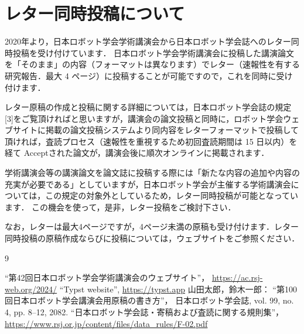 \section{レター同時投稿について}
2020年より，日本ロボット学会学術講演会から日本ロボット学会誌へのレター同時投稿を受け付けています．
日本ロボット学会学術講演会に投稿した講演論文を「そのまま」の内容（フォーマットは異なります）でレター（速報性を有する研究報告．最大 4 ページ）に投稿することが可能ですので，これを同時に受け付けます． 

レター原稿の作成と投稿に関する詳細については，日本ロボット学会誌の規定[3]をご覧頂ければと思いますが，講演会の論文投稿と同時に，ロボット学会ウェブサイトに掲載の論文投稿システムより同内容をレターフォーマットで投稿して頂ければ，査読プロセス（速報性を重視するため初回査読期間は 15 日以内）を経て Acceptされた論文が，講演会後に順次オンラインに掲載されます．

学術講演会等の講演論文を論文誌に投稿する際には「新たな内容の追加や内容の充実が必要である」としていますが，日本ロボット学会が主催する学術講演会については，この規定の対象外としているため，レター同時投稿が可能となっています．
この機会を使って，是非，レター投稿をご検討下さい．

なお，レターは最大4ページですが，4ページ未満の原稿も受け付けます．レター同時投稿の原稿作成ならびに投稿については，ウェブサイト\cite{website}をご参照ください．



\scriptsize
\begin{thebibliography}{9}

``第42回日本ロボット学会学術講演会のウェブサイト''，
  \url{https://ac.rsj-web.org/2024/}
  ``Typst website'',
  \url{https://typst.app}
  山田太郎，鈴木一郎：
  ``第100回日本ロボット学会講演会用原稿の書き方''，
  日本ロボット学会誌, vol. 99, no. 4, pp. 8--12, 2082.
  ``日本ロボット学会誌・寄稿および査読に関する規則集''，
  \url{https://www.rsj.or.jp/content/files/data_rules/F-02.pdf}
\end{thebibliography}
